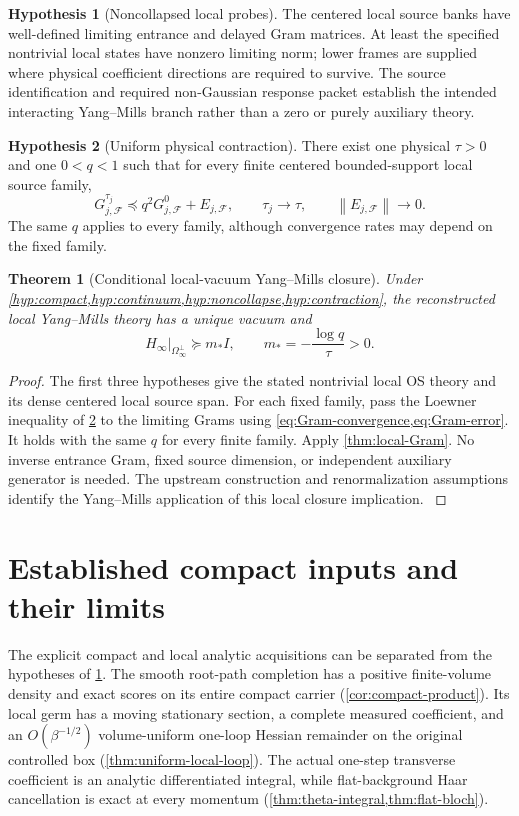 \documentclass[11pt,oneside,openany]{book}
\newtheorem{theorem}{Theorem}[chapter]
\theoremstyle{definition}
\newtheorem{hypothesis}[hypothesis]{Hypothesis}
\theoremstyle{remark}
\newcommand{\norm}[1]{\left\lVert#1\right\rVert}
\newcommand{\src}[2]{\cite[#2]{#1}}
\begin{document}
\begin{hypothesis}[Noncollapsed local probes]\label{hyp:noncollapse}
The centered local source banks have well-defined limiting entrance and delayed Gram matrices. At least the specified nontrivial local states have nonzero limiting norm; lower frames are supplied where physical coefficient directions are required to survive. The source identification and required non-Gaussian response packet establish the intended interacting Yang--Mills branch rather than a zero or purely auxiliary theory.
\end{hypothesis}

\begin{hypothesis}[Uniform physical contraction]\label{hyp:contraction}
There exist one physical $\tau>0$ and one $0<q<1$ such that for every finite centered bounded-support local source family,
\[
G_{j,\mathcal F}^{\tau_j}\preceq q^2G_{j,\mathcal F}^0+E_{j,\mathcal F},
\qquad \tau_j\to\tau,\qquad \norm{E_{j,\mathcal F}}\to0.
\]
The same $q$ applies to every family, although convergence rates may depend on the fixed family.
\end{hypothesis}

\begin{theorem}[Conditional local-vacuum Yang--Mills closure]\label{thm:master}
Under \cref{hyp:compact,hyp:continuum,hyp:noncollapse,hyp:contraction}, the reconstructed local Yang--Mills theory has a unique vacuum and
\begin{equation}\label{eq:master-gap}
\boxed{\displaystyle
H_\infty|_{\Omega_\infty^\perp}\succeq m_*I,
\qquad m_*=-\frac{\log q}{\tau}>0.}
\end{equation}
\end{theorem}
\begin{proof}
The first three hypotheses give the stated nontrivial local OS theory and its dense centered local source span. For each fixed family, pass the Loewner inequality of \cref{hyp:contraction} to the limiting Grams using \cref{eq:Gram-convergence,eq:Gram-error}. It holds with the same $q$ for every finite family. Apply \cref{thm:local-Gram}. No inverse entrance Gram, fixed source dimension, or independent auxiliary generator is needed. The upstream construction and renormalization assumptions identify the Yang--Mills application of this local closure implication. \src{F1}{V1}
\end{proof}

\section{Established compact inputs and their limits}
The explicit compact and local analytic acquisitions can be separated
from the hypotheses of \cref{thm:master}. The smooth root-path completion
has a positive finite-volume density and exact scores on its entire
compact carrier (\cref{cor:compact-product}). Its local germ has a
moving stationary section, a complete measured coefficient, and an
$O(\beta^{-1/2})$ volume-uniform one-loop Hessian remainder on the
original controlled box (\cref{thm:uniform-local-loop}). The actual
one-step transverse coefficient is an analytic differentiated integral,
while flat-background Haar cancellation is exact at every momentum
(\cref{thm:theta-integral,thm:flat-bloch}).
\end{document}
